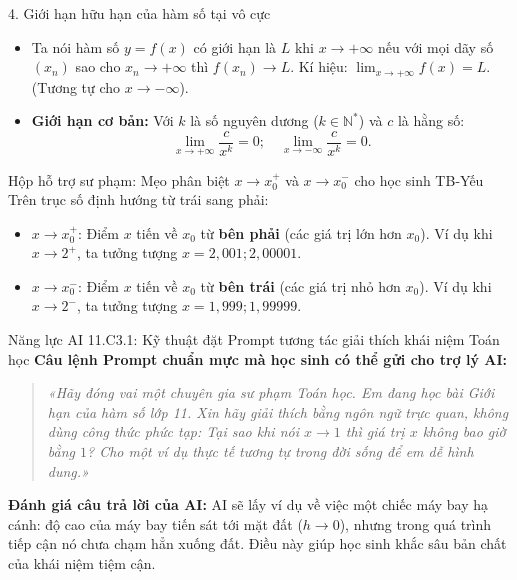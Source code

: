 \documentclass[12pt, a4paper]{article}
\begin{document}
\begin{pedabox}{4. Giới hạn hữu hạn của hàm số tại vô cực}
\begin{itemize}[leftmargin=0.6cm]
    \item Ta nói hàm số $y = f(x)$ có giới hạn là $L$ khi $x \to +\infty$ nếu với mọi dãy số $(x_n)$ sao cho $x_n \to +\infty$ thì $f(x_n) \to L$. Kí hiệu: $\lim_{x \to +\infty} f(x) = L$. (Tương tự cho $x \to -\infty$).
    \item \textbf{Giới hạn cơ bản:} Với $k$ là số nguyên dương ($k \in \mathbb{N}^*$) và $c$ là hằng số:
    $$\lim_{x \to +\infty} \dfrac{c}{x^k} = 0; \quad \lim_{x \to -\infty} \dfrac{c}{x^k} = 0.$$
\end{itemize}
\end{pedabox}

\begin{scaffoldbox}{Hộp hỗ trợ sư phạm: Mẹo phân biệt $x \to x_0^+$ và $x \to x_0^-$ cho học sinh TB-Yếu}
Trên trục số định hướng từ trái sang phải:
\begin{itemize}[leftmargin=0.6cm]
    \item $x \to x_0^+$: Điểm $x$ tiến về $x_0$ từ \textbf{bên phải} (các giá trị lớn hơn $x_0$). Ví dụ khi $x \to 2^+$, ta tưởng tượng $x = 2{,}001; 2{,}00001$.
    \item $x \to x_0^-$: Điểm $x$ tiến về $x_0$ từ \textbf{bên trái} (các giá trị nhỏ hơn $x_0$). Ví dụ khi $x \to 2^-$, ta tưởng tượng $x = 1{,}999; 1{,}99999$.
\end{itemize}
\end{scaffoldbox}

\begin{aibox}{Năng lực AI 11.C3.1: Kỹ thuật đặt Prompt tương tác giải thích khái niệm Toán học}
\textbf{Câu lệnh Prompt chuẩn mực mà học sinh có thể gửi cho trợ lý AI:}
\begin{quote}
\textit{«Hãy đóng vai một chuyên gia sư phạm Toán học. Em đang học bài Giới hạn của hàm số lớp 11. Xin hãy giải thích bằng ngôn ngữ trực quan, không dùng công thức phức tạp: Tại sao khi nói $x \to 1$ thì giá trị $x$ không bao giờ bằng $1$? Cho một ví dụ thực tế tương tự trong đời sống để em dễ hình dung.»}
\end{quote}
\textbf{Đánh giá câu trả lời của AI:} AI sẽ lấy ví dụ về việc một chiếc máy bay hạ cánh: độ cao của máy bay tiến sát tới mặt đất ($h \to 0$), nhưng trong quá trình tiếp cận nó chưa chạm hẳn xuống đất. Điều này giúp học sinh khắc sâu bản chất của khái niệm tiệm cận.
\end{aibox}
\end{document}
